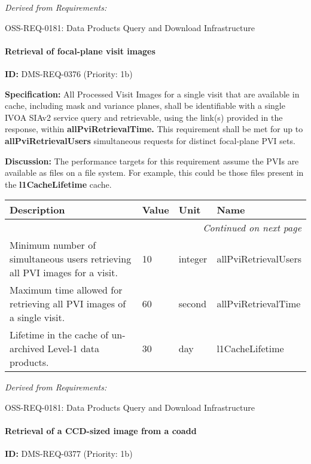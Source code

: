 \documentclass[SE,toc,lsstdraft]{lsstdoc}
\makeatletter
\newcommand{\paramname}[1]{\hspace{0pt}#1}
\newcommand{\unitname}[1]{\hspace{0pt}#1}
\newenvironment{parameters}[0]{%
\setlength\LTleft{0pt}
\setlength\LTright{\fill}
\begin{small}
\begin{longtable}[]{|p{0.49\textwidth}|l|p{0.6in}|p{1.70in}@{}|}

\hline \textbf{Description} & \textbf{Value} & \textbf{Unit} & \textbf{Name} \\ \hline
\endhead

\hline \multicolumn{4}{r}{\emph{Continued on next page}} \\
\endfoot

\hline\hline
\endlastfoot
}{%
\hline
\end{longtable}
\end{small}
}
\makeatother
\begin{document}
\emph{Derived from Requirements:}

OSS-REQ-0181:
Data Products Query and Download Infrastructure \newline

\paragraph{Retrieval of focal-plane visit images}\hfill  %

\label{DMS-REQ-0376}
\textbf{ID:} DMS-REQ-0376 (Priority: 1b)

\textbf{Specification:}
All Processed Visit Images for a single visit that are available in cache, including mask and variance planes, shall be identifiable with a single IVOA SIAv2 service query and retrievable, using the link(s) provided in the response, within \textbf{allPviRetrievalTime.} This requirement shall be met for up to \textbf{allPviRetrievalUsers} simultaneous requests for distinct focal-plane PVI sets.

\textbf{Discussion:}
The performance targets for this requirement assume the PVIs are available as files on a file system. For example, this could be those files present in the \textbf{l1CacheLifetime} cache.

\begin{parameters}
Minimum number of simultaneous users retrieving all PVI images for a visit.
&
10
&
\unitname{%
integer
}
&
\paramname{%
allPviRetrievalUsers
} \\\hline
Maximum time allowed for retrieving all PVI images of a single visit.
&
60
&
\unitname{%
second
}
&
\paramname{%
allPviRetrievalTime
} \\\hline
Lifetime in the cache of un-archived Level-1 data products.
&
30
&
\unitname{%
day
}
&
\paramname{%
l1CacheLifetime
} \\\hline
\end{parameters}

\emph{Derived from Requirements:}

OSS-REQ-0181:
Data Products Query and Download Infrastructure \newline

\paragraph{Retrieval of a CCD-sized image from a coadd}\hfill  %

\label{DMS-REQ-0377}
\textbf{ID:} DMS-REQ-0377 (Priority: 1b)
\end{document}
